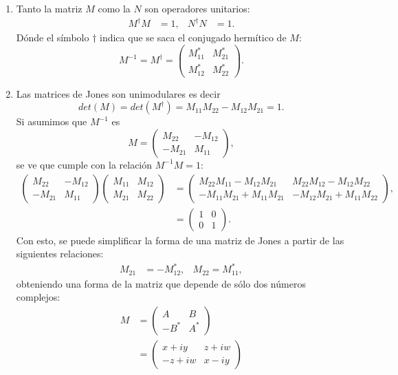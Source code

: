 \begin{enumerate}
\item Tanto la matriz $M$ como la $N$ son operadores unitarios:
  \begin{align*}
    M^{\dagger} M &= 1,& N^{\dagger}N &=1.
  \end{align*}
Dónde el símbolo $\dagger$ indica que se saca el conjugado hermítico
de $M$:
\begin{equation*}
M^{-1}=M^{\dagger}=
  \begin{pmatrix}
      M_{11}^*&M_{21}^*\\M_{12}^* & M_{22}^*
    \end{pmatrix}.
\end{equation*}
\item Las matrices de Jones son unimodulares es decir
$$det(M) = det(M^{\dagger})  = M_{11}M_{22}-M_{12}M_{21} = 1.$$ 
Si asumimos que $M^{-1}$ es
\begin{equation*}
  M=
  \begin{pmatrix}
    M_{22}&-M_{12}\\-M_{21}&M_{11}
  \end{pmatrix},
\end{equation*}
se ve que cumple con la relación $M^{-1}M = 1$:
\begin{align*}
    \begin{pmatrix}
    M_{22}&-M_{12}\\-M_{21}&M_{11}
  \end{pmatrix}
\begin{pmatrix}
      M_{11}&M_{12}\\M_{21} & M_{22}
    \end{pmatrix}
&=
    \begin{pmatrix}
 M_{22}M_{11}-M_{12}M_{21}     & M_{22}M_{12}-M_{12}M_{22}\\
-M_{11}M_{21}+M_{11}M_{21}    & -M_{12}M_{21} + M_{11}M_{22} 
    \end{pmatrix},\\
&=
\begin{pmatrix}
  1 &0\\0&1
\end{pmatrix}.
\end{align*}
Con esto, se puede simplificar la forma de una matriz de Jones a
partir de las siguientes relaciones:
\begin{align*}
  M_{21} &= - M_{12}^*, & M_{22} = M_{11}^*,
\end{align*}
obteniendo una forma de la matriz que depende de sólo dos números
complejos:
\begin{align}
  M&=
  \begin{pmatrix}
    A & B \\-B^* & A^*
  \end{pmatrix}\\
&=
  \begin{pmatrix}
    x+iy & z+iw \\-z+iw & x-iy
  \end{pmatrix}
\label{eq:general_jones_matrix}
\end{align}


\end{enumerate}
